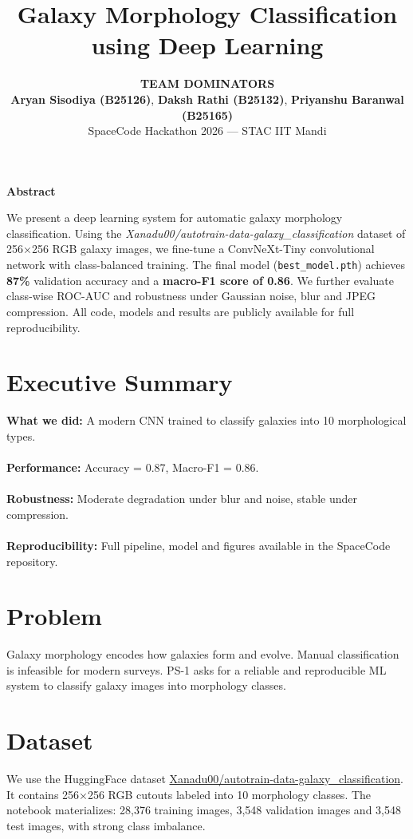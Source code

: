 \documentclass[11pt,a4paper]{article}
\title{\textbf{\Large Galaxy Morphology Classification using Deep Learning}}
\author{
\textbf{\MakeUppercase{TEAM DOMINATORS}}\\
\textbf{Aryan Sisodiya (B25126)}, \textbf{Daksh Rathi (B25132)}, \textbf{Priyanshu Baranwal (B25165)}\\
SpaceCode Hackathon 2026 — STAC IIT Mandi
}
\date{}
\begin{document}
\maketitle

\begin{center}
{\large\textbf{Abstract}}
\end{center}
We present a deep learning system for automatic galaxy morphology classification. Using the
\emph{Xanadu00/autotrain-data-galaxy\_classification} dataset of 256×256 RGB galaxy images, we fine-tune a
ConvNeXt-Tiny convolutional network with class-balanced training. The final model
(\texttt{best\_model.pth}) achieves \textbf{87\%} validation accuracy and a \textbf{macro-F1 score of 0.86}.
We further evaluate class-wise ROC-AUC and robustness under Gaussian noise, blur and JPEG compression.
All code, models and results are publicly available for full reproducibility.

\section*{Executive Summary}
\textbf{What we did:} A modern CNN trained to classify galaxies into 10 morphological types.\\\\  
\textbf{Performance:} Accuracy = 0.87, Macro-F1 = 0.86.\\\\  
\textbf{Robustness:} Moderate degradation under blur and noise, stable under compression.\\\\  
\textbf{Reproducibility:} Full pipeline, model and figures available in the SpaceCode repository.

\section{Problem}
Galaxy morphology encodes how galaxies form and evolve. Manual classification is infeasible for modern surveys.
PS-1 asks for a reliable and reproducible ML system to classify galaxy images into morphology classes.

\section{Dataset}
We use the HuggingFace dataset
\href{https://huggingface.co/datasets/Xanadu00/autotrain-data-galaxy_classification}{Xanadu00/autotrain-data-galaxy\_classification}.
It contains 256×256 RGB cutouts labeled into 10 morphology classes. The notebook materializes:
28,376 training images, 3,548 validation images and 3,548 test images, with strong class imbalance.
\end{document}
